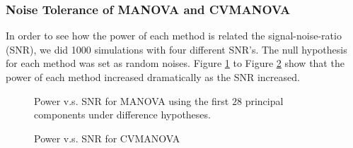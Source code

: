 \subsubsection{Noise Tolerance of MANOVA and CVMANOVA}

In order to see how the power of each method is related the signal-noise-ratio
(SNR), we did 1000 simulations with four different SNR's. The null
hypothesis for each method was set as random noises. Figure \ref{fig:MANOVA-SNR}
to Figure \ref{fig:CVMANOVA-SNR} show that the power of each method
increased dramatically as the SNR increased.

\begin{figure}[t]
\begin{centering}
\par\end{centering}

\centering{}\protect\caption{Power v.s. SNR for MANOVA using the first $28$ principal components
under difference hypotheses.\label{fig:MANOVA-SNR}}
\end{figure}


\begin{figure}[t]
\centering{}\protect\caption{Power v.s. SNR for CVMANOVA \label{fig:CVMANOVA-SNR}}
\end{figure}

